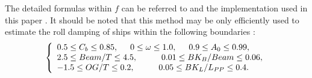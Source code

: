 The detailed formulas within $f$ can be referred to\parencite{ikeda_velocity_1979, kawahara_simple_2011} and the implementation used in this paper  \parencite{alexandersson_martinlarsalbertrolldecay-estimators_2020}.
It should be noted that this method may be only efficiently used to estimate the roll damping of ships within the following boundaries \parencite{kawahara_simple_2011}:
\begin{equation}
    \label{eq:SI_limits}
     \left\{
     \begin{array}{ll}
    0.5 \leq C_b \leq 0.85,\hspace{0.5cm} 
    0 \leq \omega \leq 1.0,
    \hspace{0.5cm}
    0.9 \leq A_0 \leq 0.99,\\
    2.5\leq Beam/T \leq 4.5, \hspace{1cm}
    0.01 \leq BK_B/Beam \leq 0.06, \\
        -1.5 \leq OG/T \leq 0.2,
     \hspace{1cm}
    0.05 \leq BK_L/L_{PP} \leq 0.4.
    \end{array}
    \right.
\end{equation}






